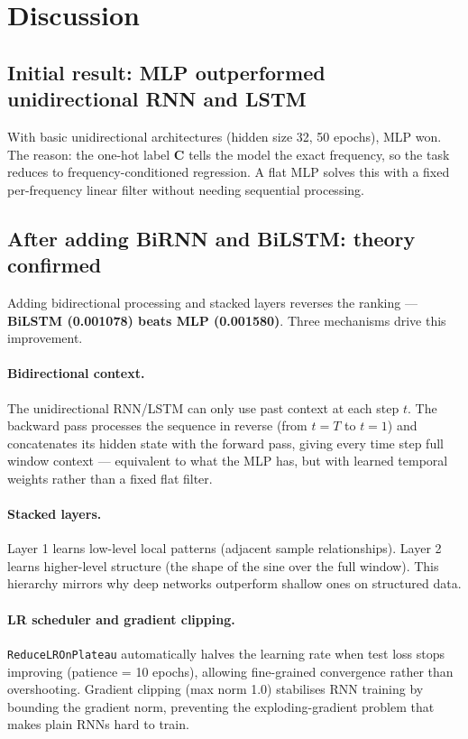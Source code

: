 \documentclass[12pt, a4paper]{article}
\begin{document}
\section{Discussion}
\label{sec:disc}

\subsection{Initial result: MLP outperformed unidirectional RNN and LSTM}

With basic unidirectional architectures (hidden size 32, 50 epochs), MLP won.
The reason: the one-hot label $\mathbf{C}$ tells the model the exact
frequency, so the task reduces to frequency-conditioned regression.
A flat MLP solves this with a fixed per-frequency linear filter without
needing sequential processing.

\subsection{After adding BiRNN and BiLSTM: theory confirmed}

Adding bidirectional processing and stacked layers reverses the ranking —
\textbf{BiLSTM (0.001078) beats MLP (0.001580)}.
Three mechanisms drive this improvement.

\paragraph{Bidirectional context.}
The unidirectional RNN/LSTM can only use past context at each step $t$.
The backward pass processes the sequence in reverse (from $t=T$ to $t=1$)
and concatenates its hidden state with the forward pass, giving every
time step full window context — equivalent to what the MLP has, but with
learned temporal weights rather than a fixed flat filter.

\paragraph{Stacked layers.}
Layer 1 learns low-level local patterns (adjacent sample relationships).
Layer 2 learns higher-level structure (the shape of the sine over the
full window). This hierarchy mirrors why deep networks outperform shallow
ones on structured data.

\paragraph{LR scheduler and gradient clipping.}
\texttt{ReduceLROnPlateau} automatically halves the learning rate when
test loss stops improving (patience = 10 epochs), allowing fine-grained
convergence rather than overshooting.
Gradient clipping (max norm 1.0) stabilises RNN training by bounding the
gradient norm, preventing the exploding-gradient problem that makes plain
RNNs hard to train.
\end{document}

